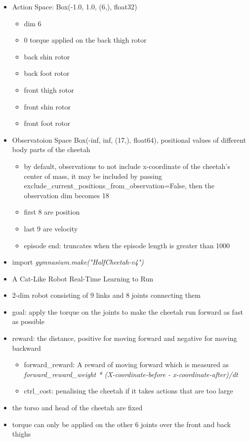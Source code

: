 \documentclass{article}
\begin{document}
\begin{itemize}
\item Action Space: Box(-1.0, 1.0, (6,), float32)
    \begin{itemize}
    \item dim 6
    \item 0 torque applied on the back thigh rotor 
    \item back shin rotor
    \item back foot rotor
    \item front thigh rotor
    \item front shin rotor
    \item front foot rotor
    \end{itemize}
\item Observatoion Space Box(-inf, inf, (17,), float64), positional values of different body parts of the cheetah
    \begin{itemize}
        \item by default, observations to not include x-coordinate of the cheetah's center of mass, it may be included by passing 
            exclude\_current\_positions\_from\_observation=False, then the observation dim becomes 18
        \item first 8 are position
        \item last 9 are velocity
        \item episode end: truncates when the episode length is greater than 1000
    \end{itemize}
\item import \textit{gymnasium.make("HalfCheetah-v4")}
\item A Cat-Like Robot Real-Time Learning to Run
\item 2-dim robot consisting of 9 links and 8 joints connecting them
\item goal: apply the torque on the joints to make the cheetah run forward as fast as possible
\item reward: the distance, positive for moving forward and negative for moving backward
    \begin{itemize}
        \item forward\_reward: A reward of moving forward which is measured as \textit{forward\_reward\_weight * (X-coordinate-before - x-coordinate-after)/dt}
        \item ctrl\_cost: penalising the cheetah if it takes actions that are too large
    \end{itemize}
\item the torso and head of the cheetah are fixed
\item torque can only be applied on the other 6 joints over the front and back thighs
\end{itemize}


\end{document}

